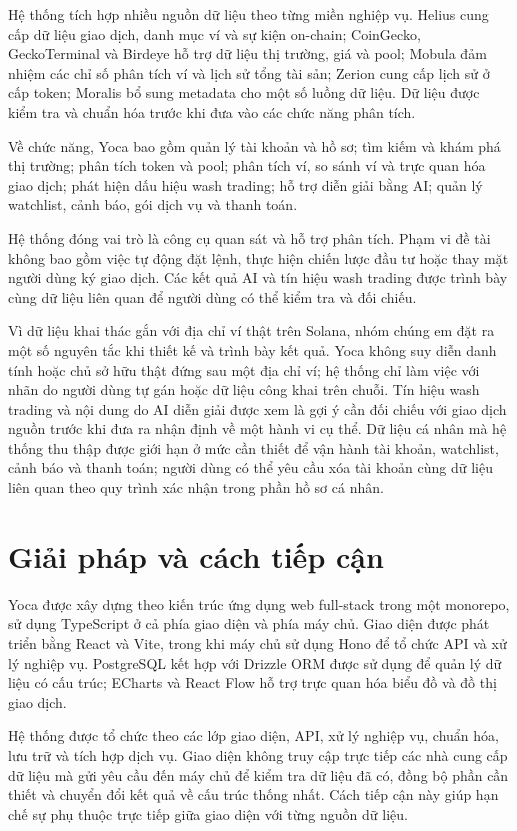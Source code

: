 Hệ thống tích hợp nhiều nguồn dữ liệu theo từng miền nghiệp vụ. Helius cung cấp dữ liệu giao dịch, danh mục ví và sự kiện on-chain; CoinGecko, GeckoTerminal và Birdeye hỗ trợ dữ liệu thị trường, giá và pool; Mobula đảm nhiệm các chỉ số phân tích ví và lịch sử tổng tài sản; Zerion cung cấp lịch sử ở cấp token; Moralis bổ sung metadata cho một số luồng dữ liệu. Dữ liệu được kiểm tra và chuẩn hóa trước khi đưa vào các chức năng phân tích.

Về chức năng, Yoca bao gồm quản lý tài khoản và hồ sơ; tìm kiếm và khám phá thị trường; phân tích token và pool; phân tích ví, so sánh ví và trực quan hóa giao dịch; phát hiện dấu hiệu wash trading; hỗ trợ diễn giải bằng AI; quản lý watchlist, cảnh báo, gói dịch vụ và thanh toán.

Hệ thống đóng vai trò là công cụ quan sát và hỗ trợ phân tích. Phạm vi đề tài không bao gồm việc tự động đặt lệnh, thực hiện chiến lược đầu tư hoặc thay mặt người dùng ký giao dịch. Các kết quả AI và tín hiệu wash trading được trình bày cùng dữ liệu liên quan để người dùng có thể kiểm tra và đối chiếu.

Vì dữ liệu khai thác gắn với địa chỉ ví thật trên Solana, nhóm chúng em đặt ra một số nguyên tắc khi thiết kế và trình bày kết quả. Yoca không suy diễn danh tính hoặc chủ sở hữu thật đứng sau một địa chỉ ví; hệ thống chỉ làm việc với nhãn do người dùng tự gán hoặc dữ liệu công khai trên chuỗi. Tín hiệu wash trading và nội dung do AI diễn giải được xem là gợi ý cần đối chiếu với giao dịch nguồn trước khi đưa ra nhận định về một hành vi cụ thể. Dữ liệu cá nhân mà hệ thống thu thập được giới hạn ở mức cần thiết để vận hành tài khoản, watchlist, cảnh báo và thanh toán; người dùng có thể yêu cầu xóa tài khoản cùng dữ liệu liên quan theo quy trình xác nhận trong phần hồ sơ cá nhân.

\section{Giải pháp và cách tiếp cận}
\label{sec:giai_phap}

Yoca được xây dựng theo kiến trúc ứng dụng web full-stack trong một monorepo, sử dụng TypeScript ở cả phía giao diện và phía máy chủ. Giao diện được phát triển bằng React và Vite, trong khi máy chủ sử dụng Hono để tổ chức API và xử lý nghiệp vụ. PostgreSQL kết hợp với Drizzle ORM được sử dụng để quản lý dữ liệu có cấu trúc; ECharts và React Flow hỗ trợ trực quan hóa biểu đồ và đồ thị giao dịch.

Hệ thống được tổ chức theo các lớp giao diện, API, xử lý nghiệp vụ, chuẩn hóa, lưu trữ và tích hợp dịch vụ. Giao diện không truy cập trực tiếp các nhà cung cấp dữ liệu mà gửi yêu cầu đến máy chủ để kiểm tra dữ liệu đã có, đồng bộ phần cần thiết và chuyển đổi kết quả về cấu trúc thống nhất. Cách tiếp cận này giúp hạn chế sự phụ thuộc trực tiếp giữa giao diện với từng nguồn dữ liệu.

